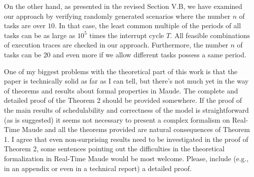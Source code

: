 \documentclass[10pt,journal]{IEEEtran}
\newcommand{\hide}[1]{\ignorespaces}
\newcommand{\ANSWER}{\medskip\noindent{\bf RESPONSE: }}
\newcommand{\COMMENT}{\medskip\noindent{\bf COMMENT: }}
\begin{document}
On the other hand, as presented in the revised Section V.B, we have
examined our approach by verifying randomly generated scenarios where
the number $n$ of tasks are over $10$. In that case, the least common
multiple of the periods of all tasks can be as large as $10^5$ times
the interrupt cycle $T$. All feasible combinations of execution traces
are checked in our approach. Furthermore, the number $n$ of tasks can
be $20$ and even more if we allow different tasks possess a same
period.

\hide{
the modeled RMS implementation serves in an avionic control systems
from our industrial partner. It is a real-world application within the
field of industrial real-time systems. And the scenarios presented in
Section V.B are also real scenarios that our partner is using in the
system. Our partner indicated that there would be at most $5$ tasks in
the task set for the implementation. On the other hand, in the current
version, we have randomly generated large numbers of test cases to
examine the efficiency of our schedulability test that is based on
model checking, as discussed in Section V.B. The capability of model
checking is restricted by the scale of the state space of the
model. In our model, the model checking can handle scenarios where
$mn$ is up to $10^6$ in an acceptable period of time. With $mn=10^6$
and reasonable task periods, the number $n$ of tasks can be at least
$10$, which has already fulfilled the requirements of the target
implementation. Further with particular task periods, the number $n$
of tasks can be $20$ or more.
}

\COMMENT 

One of my biggest problems with the theoretical part of this work is
that the paper is technically solid as far as I can tell, but there's
not much yet in the way of theorems and results about formal
properties in Maude. The complete and detailed proof of the Theorem 2
should be provided somewhere. If the proof of the main results of
schedulability and correctness of the model is straightforward (as is
suggested) it seems not necessary to present a complex formalism on
Real-Time Maude and all the theorems provided are natural consequences
of Theorem 1. I agree that even non-surprising results need to be
investigated in the proof of Theorem 2, some sentences pointing out
the difficulties in the theoretical formalization in Real-Time Maude
would be most welcome. Please, include (e.g., in an appendix or even
in a technical report) a detailed proof.

\ANSWER 
\end{document}

